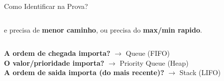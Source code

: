 \documentclass[aspectratio=169,11pt]{beamer}
\begin{document}
\begin{frame}{Como Identificar na Prova?}
\begin{columns}[t]
\begin{tcolorbox}[caixaRoxa,title={Sinal: use Priority Queue}]
        e precisa de \textbf{menor caminho},
        ou precisa do \textbf{max/min rapido}.
      \end{tcolorbox}
  \end{columns}
  \vspace{0.1cm}
  \begin{tcolorbox}[caixaAmarelo,title={Pergunta magica}]
    \small
    \textbf{A ordem de chegada importa?} $\to$ Queue (FIFO)\\
    \textbf{O valor/prioridade importa?} $\to$ Priority Queue (Heap)\\
    \textbf{A ordem de saida importa (do mais recente)?} $\to$ Stack (LIFO)
  \end{tcolorbox}
\end{frame}

\end{document}
